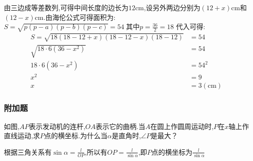 \documentclass[answers]{exam}
\begin{document}
\begin{questions}
\begin{solution}

		由三边成等差数列,可得中间长度的边长为$12$cm,设另外两边分别为$(12+x)$cm和$(12-x)$cm.由海伦公式可得面积为:
		\begin{math}
			S = \sqrt{p(p-a)(p-b)(p-c)} = 54\; \text{其中} p = \frac{36}{2} = 18
		\end{math}
		代入可得:
		\begin{align*}
			S = \sqrt{18(18 - 12 + x)(18 - 12 - x)(18 - 12)} & = 54              \\
			\sqrt{18\cdot 6 (36-x^2)}                        & = 54              \\
			18\cdot 6 (36- x^2)                              & = 54^2            \\
			x^2                                              & = 9               \\
			x                                                & = 3 (\mathrm{cm})
		\end{align*}

	\end{solution}

	\begin{center}
		\subsubsection*{附加题}
	\end{center}

	\question
	如图,$AP$表示发动机的连杆,$OA$表示它的曲柄.当$A$在圆上作圆周运动时,$P$在$x$轴上作直线运动,求$P$点的横坐标.为什么当$\alpha$是直角时,$\angle{P}$是最大？

	\begin{solution}
		根据三角关系有$\sin\alpha = \frac{l}{OP}$,所以有$OP =
			\frac{l}{\sin\alpha}$,即$P$点的横坐标为$\frac{l}{\sin\alpha}$


\end{solution}
\end{questions}
\end{document}
